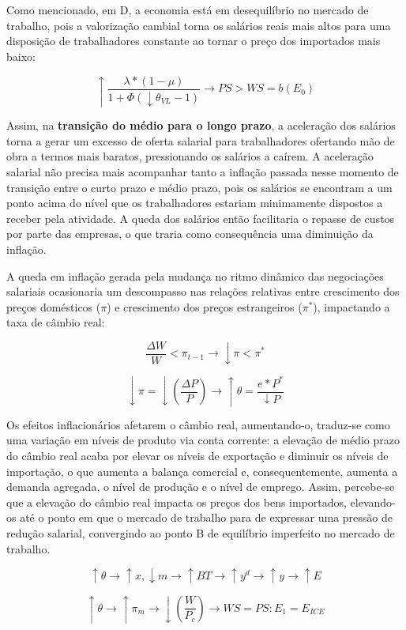 \documentclass[a4paper,12pt]{article}[abntex2]
\begin{document}
Como mencionado, em D, a economia está em desequilíbrio no mercado de trabalho, pois a valorização cambial torna os salários reais mais altos para uma disposição de trabalhadores constante ao tornar o preço dos importados mais baixo: 

\[
\uparrow \frac{\lambda \ast (1 - \mu)}{1 + \Phi (\downarrow \theta_{VL} - 1)} \rightarrow PS > WS = b(E_0)
\]

Assim, na \textbf{transição do médio para o longo prazo}, a aceleração dos salários torna a gerar um excesso de oferta salarial para trabalhadores ofertando mão de obra a termos mais baratos, pressionando os salários a caírem. A aceleração salarial não precisa mais acompanhar tanto a inflação passada nesse momento de transição entre o curto prazo e médio prazo, pois os salários se encontram a um ponto acima do nível que os trabalhadores estariam minimamente dispostos a receber pela atividade. A queda dos salários então facilitaria o repasse de custos por parte das empresas, o que traria como consequência uma diminuição da inflação.

A queda em inflação gerada pela mudança no ritmo dinâmico das negociações salariais ocasionaria um descompasso nas relações relativas entre crescimento dos preços domésticos ($\pi$) e crescimento dos preços estrangeiros ($\pi^*$), impactando a taxa de câmbio real:

\[
\frac{\Delta W}{W} < \pi_{t-1} \rightarrow \downarrow \pi < \pi^*
\]

\[
\downarrow \pi = \downarrow \left( \frac{\Delta P}{P} \right) \rightarrow \uparrow \theta = \frac{e \ast P^*}{\downarrow P}
\]

Os efeitos inflacionários afetarem o câmbio real, aumentando-o, traduz-se como uma variação em níveis de produto via conta corrente: a elevação de médio prazo do câmbio real acaba por elevar os níveis de exportação e diminuir os níveis de importação, o que aumenta a balança comercial e, consequentemente, aumenta a demanda agregada, o nível de produção e o nível de emprego. Assim, percebe-se que a elevação do câmbio real impacta os preços dos bens importados, elevando-os até o ponto em que o mercado de trabalho para de expressar uma pressão de redução salarial, convergindo ao ponto B de equilíbrio imperfeito no mercado de trabalho.

\[
\uparrow \theta \rightarrow \uparrow x, \downarrow m \rightarrow \uparrow BT \rightarrow \uparrow y^d \rightarrow \uparrow y \rightarrow \uparrow E
\]

\[
\uparrow \theta \rightarrow \uparrow \pi_m \rightarrow \downarrow \left( \frac{W}{P_c} \right) \rightarrow WS = PS: E_1 = E_{ICE}
\]
\end{document}
